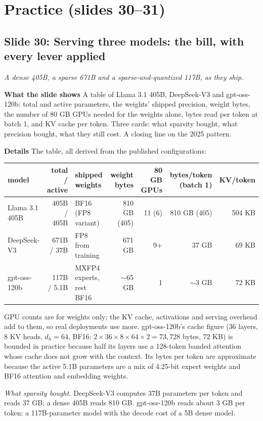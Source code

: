 \documentclass[11pt,letterpaper]{article}
\newcommand{\setstage}[1]{\colorlet{stagec}{#1}}
\newcommand{\slide}[3]{%
  \subsection[Slide #1: #2]{Slide #1: #2}%
  {\color{muted}\itshape #3\par}\medskip}
\newcommand{\para}[1]{\medskip\noindent\textbf{#1}\quad}
\begin{document}
\clearpage
\setstage{vc}
\section{Practice (slides 30--31)}

\slide{30}{Serving three models: the bill, with every lever applied}{A dense 405B, a sparse 671B and a sparse-and-quantized 117B, as they ship.}

\para{What the slide shows} A table of Llama 3.1 405B, DeepSeek-V3 and gpt-oss-120b: total and active parameters, the weights' shipped precision, weight bytes, the number of 80 GB GPUs needed for the weights alone, bytes read per token at batch 1, and KV cache per token. Three cards: what sparsity bought, what precision bought, what they still cost. A closing line on the 2025 pattern.

\para{Details} The table, all derived from the published configurations:
\begin{center}\footnotesize\setlength{\tabcolsep}{4pt}
\begin{tabular}{@{}lrlrrrr@{}}
\toprule
model & total / active & shipped weights & weight bytes & 80 GB GPUs & bytes/token (batch 1) & KV/token\\
\midrule
Llama 3.1 405B & 405B / 405B & BF16 (FP8 variant) & 810 GB (405) & 11 (6) & 810 GB (405) & 504 KB\\
DeepSeek-V3 & 671B / 37B & FP8 from training & 671 GB & 9+ & 37 GB & 69 KB\\
gpt-oss-120b & 117B / 5.1B & MXFP4 experts, rest BF16 & $\sim$65 GB & 1 & $\sim$3 GB & 72 KB\\
\bottomrule
\end{tabular}
\end{center}
GPU counts are for weights only; the KV cache, activations and serving overhead add to them, so real deployments use more. gpt-oss-120b's cache figure (36 layers, 8 KV heads, $d_h=64$, BF16: $2\times36\times8\times64\times2=73{,}728$ bytes, 72 KB) is bounded in practice because half its layers use a 128-token banded attention whose cache does not grow with the context. Its bytes per token are approximate because the active 5.1B parameters are a mix of 4.25-bit expert weights and BF16 attention and embedding weights.

\emph{What sparsity bought.} DeepSeek-V3 computes 37B parameters per token and reads 37 GB; a dense 405B reads 810 GB. gpt-oss-120b reads about 3 GB per token: a 117B-parameter model with the decode cost of a 5B dense model.
\end{document}
